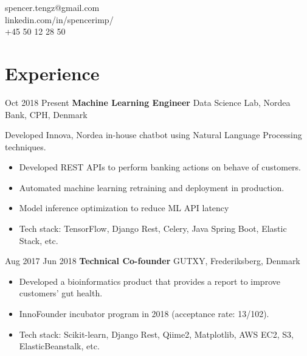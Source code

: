 \documentclass[11pt]{article} %
\begin{document}
{\begin{minipage}[t]{0.22\textwidth}
\begin{tabbing}
spencer.tengz@gmail.com \\ %
linkedin.com/in/spencerimp/ \\ %
+45 50 12 28 50 \\ %
\end{tabbing}
\end{minipage}


\section{Experience}
\job
{Oct 2018 }{Present}
{\textbf{Machine Learning Engineer}}
{}
{Data Science Lab, Nordea Bank, CPH, Denmark}
{
 
    Developed Innova, Nordea in-house chatbot using Natural Language Processing techniques.
    \begin{itemize}[itemsep=0pt]
    	\item  Developed REST APIs to perform banking actions on behave of customers.
    	\item  Automated machine learning retraining and deployment in production.
    	\item  Model inference optimization to reduce ML API latency
    	\item Tech stack: TensorFlow, Django Rest, Celery, Java Spring Boot, Elastic Stack, etc.
    \end{itemize}
}

\job
{Aug 2017 }{Jun 2018}
{\textbf{Technical Co-founder}}
{}
{GUTXY, Frederiksberg, Denmark}
{
	\begin{itemize}[itemsep=0pt]
		\item Developed a bioinformatics product that provides a report to improve customers’ gut health.
		\item InnoFounder incubator program in 2018 (acceptance rate: 13/102).
		\item Tech stack: Scikit-learn, Django Rest, Qiime2, Matplotlib, AWS EC2, S3, ElasticBeanstalk, etc.
	\end{itemize}
}

}
\end{document}
